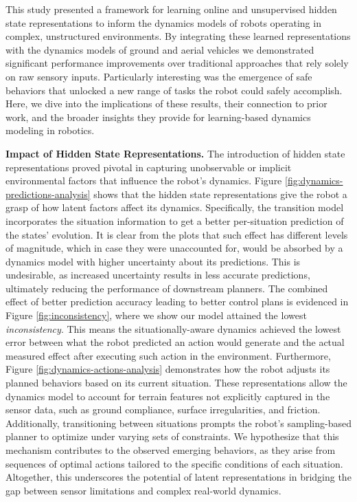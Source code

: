 \documentclass[Afour,sageh,times]{sagej}
\theoremstyle{lemma}
\begin{document}
This study presented a framework for learning online and unsupervised hidden state representations to inform the dynamics models of robots operating in complex, unstructured environments. By integrating these learned representations with the dynamics models of ground and aerial vehicles we demonstrated significant performance improvements over traditional approaches that rely solely on raw sensory inputs. Particularly interesting was the emergence of safe behaviors that unlocked a new range of tasks the robot could safely accomplish. Here, we dive into the implications of these results, their connection to prior work, and the broader insights they provide for learning-based dynamics modeling in robotics.

\textbf{Impact of Hidden State Representations.} The introduction of hidden state representations proved pivotal in capturing unobservable or implicit environmental factors that influence the robot's dynamics. Figure \ref{fig:dynamics-predictions-analysis} shows that the hidden state representations give the robot a grasp of how latent factors affect its dynamics. Specifically, the transition model incorporates the situation information to get a better per-situation prediction of the states' evolution. It is clear from the plots that such effect has different levels of magnitude, which in case they were unaccounted for, would be absorbed by a dynamics model with higher uncertainty about its predictions. This is undesirable, as increased uncertainty results in less accurate predictions, ultimately reducing the performance of downstream planners. The combined effect of better prediction accuracy leading to better control plans is evidenced in Figure \ref{fig:inconsistency}, where we show our model attained the lowest \textit{inconsistency}. This means the situationally-aware dynamics achieved the lowest error between what the robot predicted an action would generate and the actual measured effect after executing such action in the environment. 
Furthermore, Figure \ref{fig:dynamics-actions-analysis} demonstrates how the robot adjusts its planned behaviors based on its current situation. These representations allow the dynamics model to account for terrain features not explicitly captured in the sensor data, such as ground compliance, surface irregularities, and friction. Additionally, transitioning between situations prompts the robot's sampling-based planner to optimize under varying sets of constraints. We hypothesize that this mechanism contributes to the observed emerging behaviors, as they arise from sequences of optimal actions tailored to the specific conditions of each situation.
Altogether, this underscores the potential of latent representations in bridging the gap between sensor limitations and complex real-world dynamics.
\end{document}

